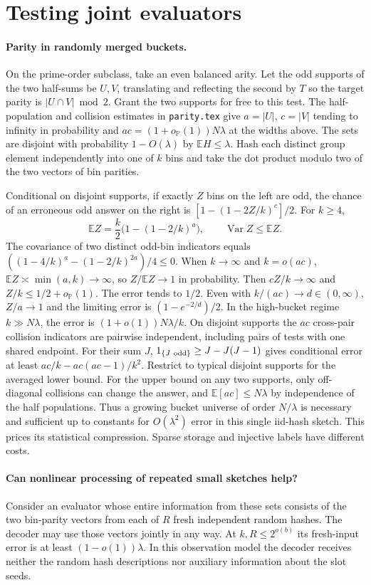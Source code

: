 \documentclass[11pt]{article}
\newcommand{\E}{\mathbb E}
\newcommand{\Prb}{\mathbb P}
\begin{document}
\section{Testing joint evaluators}
\paragraph{Parity in randomly merged buckets.}
On the prime-order subclass, take an even balanced arity. Let the odd
supports of the two half-sums be $U,V$, translating and reflecting the
second by $T$ so the target parity is $|U\cap V|\bmod2$. Grant the
two supports for free to this test. The half-population and collision
estimates in \texttt{parity.tex} give $a=|U|$, $c=|V|$ tending to
infinity in probability and $ac=(1+o_{\Prb}(1))N\lambda$ at the
widths above. The sets are disjoint with probability $1-O(\lambda)$
by $\E H\le\lambda$. Hash each distinct group element independently
into one of $k$ bins and take the dot product modulo two of the two
vectors of bin parities.

Conditional on disjoint supports, if exactly $Z$ bins on the left
are odd, the chance of an erroneous odd answer on the right is
$[1-(1-2Z/k)^c]/2$. For $k\ge4$,
\[
 \E Z=\frac{k}{2}\bigl(1-(1-2/k)^a\bigr),\qquad
 \operatorname{Var}Z\le\E Z .
\]
The covariance of two distinct odd-bin indicators equals
$((1-4/k)^a-(1-2/k)^{2a})/4\le0$.
When $k\to\infty$ and $k=o(ac)$, $\E Z\asymp\min(a,k)\to\infty$,
so $Z/\E Z\to1$ in probability. Then $cZ/k\to\infty$ and
$Z/k\le1/2+o_{\Prb}(1)$. The error tends to $1/2$. Even with
$k/(ac)\to d\in(0,\infty)$, $Z/a\to1$ and the limiting error is
$(1-e^{-2/d})/2$. In the high-bucket regime $k\gg N\lambda$, the
error is $(1+o(1))N\lambda/k$. On disjoint supports the $ac$ cross-pair
collision indicators are pairwise independent, including pairs of tests
with one shared endpoint. For their sum $J$,
$1_{\{J\ {\rm odd}\}}\ge J-J(J-1)$ gives conditional error at least
$ac/k-ac(ac-1)/k^2$. Restrict to typical disjoint supports for the
averaged lower bound. For the upper bound on any two supports, only
off-diagonal collisions can change the answer, and
$\E[ac]\le N\lambda$ by independence of the half populations.
Thus a growing bucket universe of order $N/\lambda$ is necessary
and sufficient up to constants for $O(\lambda^2)$ error in this
single iid-hash sketch. This prices its statistical compression.
Sparse storage and injective labels have different costs.

\paragraph{Can nonlinear processing of repeated small sketches help?}
Consider an evaluator whose entire information from these sets consists
of the two bin-parity vectors from each of $R$ fresh independent
random hashes. The decoder may use those vectors jointly in any way.
At $k,R\le 2^{o(b)}$ its fresh-input error is at least $(1-o(1))\lambda$.
In this observation model the decoder receives neither the random
hash descriptions nor auxiliary information about the slot seeds.
\end{document}
